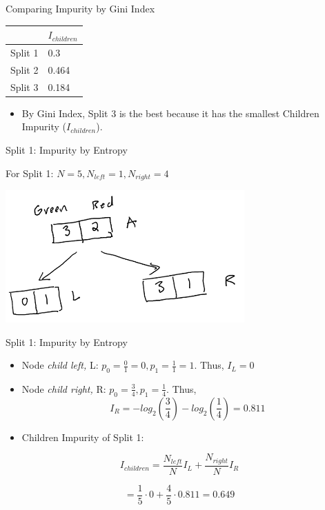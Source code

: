 \documentclass[
  ignorenonframetext,
]{beamer}
\providecommand{\tightlist}{%
  \setlength{\itemsep}{0pt}\setlength{\parskip}{0pt}}
\begin{document}
\begin{frame}{Comparing Impurity by Gini Index}
\protect\hypertarget{comparing-impurity-by-gini-index}{}

\begin{longtable}[]{@{}ll@{}}
\toprule
& \(I_{children}\)\tabularnewline
\midrule
\endhead
Split 1 & 0.3\tabularnewline
Split 2 & 0.464\tabularnewline
Split 3 & 0.184\tabularnewline
\bottomrule
\end{longtable}

\begin{itemize}
\tightlist
\item
  By Gini Index, Split 3 is the best because it has the smallest
  Children Impurity (\(I_{children}\)).
\end{itemize}

\end{frame}

\begin{frame}{Split 1: Impurity by Entropy}
\protect\hypertarget{split-1-impurity-by-entropy}{}

For Split 1: \(N = 5, N_{left} =1, N_{right} = 4\)

\includegraphics{images2/im1.png}

\end{frame}

\begin{frame}{Split 1: Impurity by Entropy}
\protect\hypertarget{split-1-impurity-by-entropy-1}{}

\begin{itemize}
\item
  Node \emph{child left,} L:
  \(p_0 = \frac{0}{1} = 0, p_1 = \frac{1}{1} = 1\). Thus, \(I_{L} = 0\)
\item
  Node \emph{child right,} R: \(p_0 = \frac{3}{4}, p_1 = \frac{1}{4}\).
  Thus, \[I_{R} = -log_2(\frac{3}{4})-log_2(\frac{1}{4}) = 0.811\]
\item
  Children Impurity of Split 1:
\end{itemize}

\[
I_{children} =  \frac{N_{left}}{N}I_{L} + \frac{N_{right}}{N}I_{R}
\]

\[ = \frac{1}{5} \cdot 0 + \frac{4}{5} \cdot 0.811 = 0.649\]

\end{frame}
\end{document}

